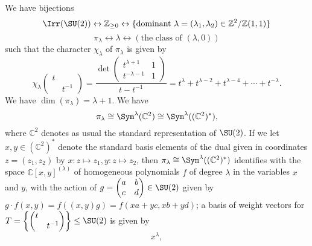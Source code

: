 \documentclass[reqno]{amsart} 
\begin{document}
\begin{theorem}
  We have bijections
  \begin{equation*}
    \Irr(\SU(2))
    \leftrightarrow
    \mathbb{Z}_{\geq 0}
    \leftrightarrow 
    \{\text{dominant }
    \lambda = (\lambda_1,\lambda_2) \in
    \mathbb{Z}^2/\mathbb{Z}(1,1)\}
  \end{equation*}
  \begin{equation*}
    \pi_\lambda \leftrightarrow \lambda \leftrightarrow (\text{the class of }(\lambda,0))
  \end{equation*}
  such that the character $\chi_\lambda$ of $\pi_\lambda$ is given by
  \begin{equation}\label{eq:char-formula-SU2}
    \chi_\lambda 
\begin{pmatrix}
      t &  \\
        & t^{-1}
    \end{pmatrix}
    =
    \frac{\det 
\begin{pmatrix}
      t^{\lambda+1} & 1 \\
      t^{-\lambda-1} & 1
    \end{pmatrix}
}{ t - t^{-1}} = t^{\lambda} + t^{\lambda-2} + t^{\lambda-4} + \dotsb + t^{-\lambda}.
\end{equation}
We have $\dim(\pi_\lambda) = \lambda + 1$.  We have
\begin{equation}
  \pi_\lambda
  \cong \Sym^\lambda(\mathbb{C}^2)
  \cong
  \Sym^\lambda ((\mathbb{C}^2)^*),
\end{equation}
where $\mathbb{C}^2$ denotes as usual the standard representation of $\SU(2)$.  If we let $x,y \in (\mathbb{C}^2)^*$ denote the standard basis elements of the dual given in coordinates $z = (z_1,z_2)$ by $x : z \mapsto z_1, y : z \mapsto z_2$, then $\pi_\lambda \cong \Sym^\lambda((\mathbb{C}^2)^*)$ identifies with the space $\mathbb{C}[x,y]^{(\lambda)}$ of homogeneous polynomials $f$ of degree $\lambda$ in the variables $x$ and $y$, with the action of $g = 
\begin{pmatrix}
  a & b \\
  c & d
\end{pmatrix}
 \in \SU(2)$ given by $g \cdot f(x,y) = f((x,y) g) = f(x a + y c, x b + y d)$; a basis of weight vectors for $T = \left\{ 
\begin{pmatrix}
  t &  \\
    & t^{-1}
\end{pmatrix}
 \right\} \leq \SU(2)$ is given by
\begin{equation}
  x^{\lambda},

\end{equation}
\end{theorem}
\end{document}
